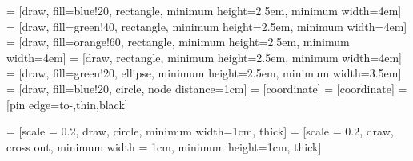 
 = [draw, fill=blue!20, rectangle, minimum height=2.5em, minimum width=4em]
 = [draw, fill=green!40, rectangle, minimum height=2.5em, minimum width=4em]
 = [draw, fill=orange!60, rectangle, minimum height=2.5em, minimum width=4em]
 = [draw, rectangle, minimum height=2.5em, minimum width=4em]
 = [draw, fill=green!20, ellipse, minimum height=2.5em, minimum width=3.5em]
 = [draw, fill=blue!20, circle, node distance=1cm]
 = [coordinate]
 = [coordinate]
 = [pin edge={to-,thin,black}]

 = [scale = 0.2, draw, circle, minimum width=1cm, thick]
 = [scale = 0.2, draw, cross out, minimum width = 1cm, minimum height=1cm, thick]